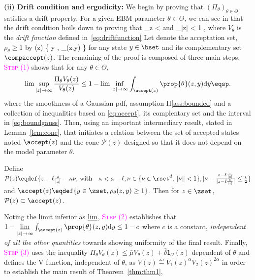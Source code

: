\documentclass[letterpaper]{article} %
\begin{document}
\medskip
\noindent \textbf{(ii) Drift condition and ergodicity: }
We begin by proving that $(\Pi_\theta)_{\theta \in \Theta}$ satisfies a drift property.
For a given EBM parameter $\theta \in \Theta$, we can see in \cite{jarner2000geometric} that the drift condition boils down to proving that
\beq\notag
\sup \limits_{z \in \zset}   < \infty \quad \textrm{and} \quad \lim \sup \limits_{|z| \to \infty}   < 1 \eqsp,
\eeq
where $V_\theta$ is the \emph{drift function} defined in~\eqref{eq:driftfunction}
Let denote the acceptation set, \ie\ $\rho_\theta \geq 1$ by 
\beq\label{eq:accept}
\accept(z) \eqdef \{ y \in \zset, \rho_\theta(z,y)  \}
\eeq
for any state $y \in \bset$ and its complementary set $\compaccept(z)$.
The remaining of the proof is composed of three main steps. 
\textcolor{magenta}{\textsc{Step (1)}} shows that for any $\theta \in \Theta$,
\begin{align}\notag
\lim \sup \limits_{|z| \to \infty}  \frac{\Pi_\theta V_\theta(z)}{V_\theta(z)} \leq 1 - \lim \inf \limits_{|z| \to \infty}  \int_{\accept(z)} \prop{\theta}(z,y)  \textrm{d}y \eqsp.
\end{align}
where the smoothness of a Gaussian pdf, assumption H\ref{ass:bounded} and a collection of inequalities based on \eqref{eq:accept}, its complentary set and the interval in \eqref{eq:boundgauss}.
Then, using an important intermediary result, stated in Lemma~\ref{lem:cone}, that initiates a relation between the set of accepted states noted $\accept(z)$ and the cone $\mathcal{P}(z)$ designed so that it does not depend on the model parameter $\theta$. 
\begin{lemm}\label{lem:cone}
Define $\mathcal{P}(z) \eqdef \{ z- \ell \frac{z}{|z|} - \kappa \nu , \, \textrm{with} \quad \kappa < a - \ell  , \nu \in \{ \nu \in \rset^d, \| \nu \| < 1\}, |\nu - \frac{z- \ell \frac{z}{|z|} }{|z- \ell \frac{z}{|z|} |} \leq \frac{\epsilon}{2}   \}$ and $\accept(z) \eqdef \{ y \in \zset, \rho_\theta(z,y) \geq 1 \}$. Then for $z \in \zset$, $\mathcal{P}(z) \subset \accept(z)$.
\end{lemm}
Noting the limit inferior as $\varliminf$, 
\textcolor{magenta}{\textsc{Step (2)}} establishes that $1 - \varliminf \limits_{|z| \to \infty}  \int_{\accept(z)} \prop{\theta}(z,y)  \textrm{d}y \leq 1 - c$ where $c$ is a constant, \emph{independent of all the other quantities} towards showing uniformity of the final result.
Finally, 
\textcolor{magenta}{\textsc{Step (3)}} uses the inequality $\Pi_\theta V_\theta(z) \leq \bar{\mu} V_\theta(z) + \bar{\delta} \mathsf{1}_{\mathcal{O}}(z)$ dependent of $\theta$ and defines the V function, independent of $\theta$, as $V(z) \eqdef V_1(z)^\alpha V_2(z)^{2\alpha}$ in order to establish the main result of Theorem~\ref{thm:thm1}, \ie
\end{document}
